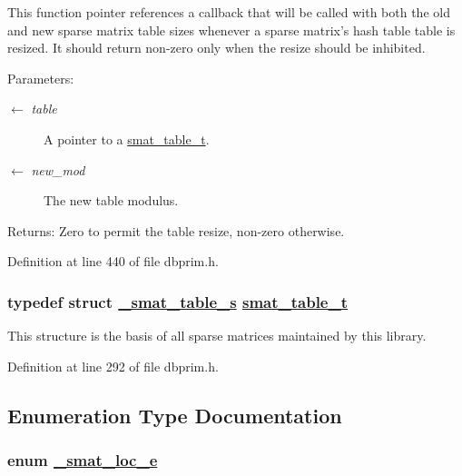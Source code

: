 This function pointer references a callback that will be called with both the old and new sparse matrix table sizes whenever a sparse matrix's hash table table is resized. It should return non-zero only when the resize should be inhibited.

\begin{Desc}
\item[Parameters:]
\begin{description}
\item[\mbox{$\leftarrow$} {\em table}]A pointer to a \hyperlink{group__dbprim__smat_ga0}{smat\_\-table\_\-t}. \item[\mbox{$\leftarrow$} {\em new\_\-mod}]The new table modulus.\end{description}
\end{Desc}
\begin{Desc}
\item[Returns:]Zero to permit the table resize, non-zero otherwise.\end{Desc}


Definition at line 440 of file dbprim.h.\hypertarget{group__dbprim__smat_ga0}{
\subsubsection[smat\_\-table\_\-t]{\setlength{\rightskip}{0pt plus 5cm}typedef struct \hyperlink{struct__smat__table__s}{\_\-smat\_\-table\_\-s} \hyperlink{struct__smat__table__s}{smat\_\-table\_\-t}}}
\label{group__dbprim__smat_ga0}


This structure is the basis of all sparse matrices maintained by this library.

Definition at line 292 of file dbprim.h.

\subsection{Enumeration Type Documentation}
\hypertarget{group__dbprim__smat_ga70}{
\subsubsection[\_\-smat\_\-loc\_\-e]{\setlength{\rightskip}{0pt plus 5cm}enum \hyperlink{group__dbprim__smat_ga70}{\_\-smat\_\-loc\_\-e}}}
\label{group__dbprim__smat_ga70}


